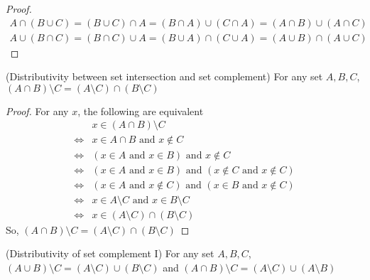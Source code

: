\begin{proof}
    \begin{gather*}
        A\cap (B\cup C) = (B\cup C)\cap A = (B\cap A)\cup (C\cap A) = (A\cap B)\cup (A\cap C)\\
        A\cup (B\cap C) = (B\cap C)\cup A = (B\cup A)\cap (C\cup A) = (A\cup B)\cap (A\cup C)
    \end{gather*}
\end{proof}
\begin{prop}
    {(Distributivity between set intersection and set complement) For any set $A,B,C$, $(A\cap B)\setminus C = (A\setminus C) \cap (B\setminus C)$}
\end{prop}
\begin{proof}
    For any $x$, the following are equivalent 
    \begin{align*}
        & x\in(A\cap B)\setminus C\\
        \Leftrightarrow & x\in A\cap B\text{ and }x\not\in C\\
        \Leftrightarrow & (x\in A\text{ and }x\in B)\text{ and }x\not\in C\\
        \Leftrightarrow & (x\in A\text{ and }x\in B)\text{ and }(x\not\in C\text{ and } x\not\in C)\\
        \Leftrightarrow & (x\in A\text{ and }x\not\in C)\text{ and }(x\in B\text{ and }x\not\in C)\\
        \Leftrightarrow & x\in A\setminus C \text{ and }x\in B\setminus C\\
        \Leftrightarrow & x\in (A\setminus C)\cap (B\setminus C)
    \end{align*}
    So, $(A\cap B)\setminus C = (A\setminus C)\cap (B\setminus C)$
\end{proof}
\begin{prop}
    {(Distributivity of set complement I) For any set $A,B,C$, $(A\cup B)\setminus C = (A\setminus C)\cup (B\setminus C)$ and $(A\cap B)\setminus C = (A\setminus C)\cup (A\setminus B)$}
\end{prop}

